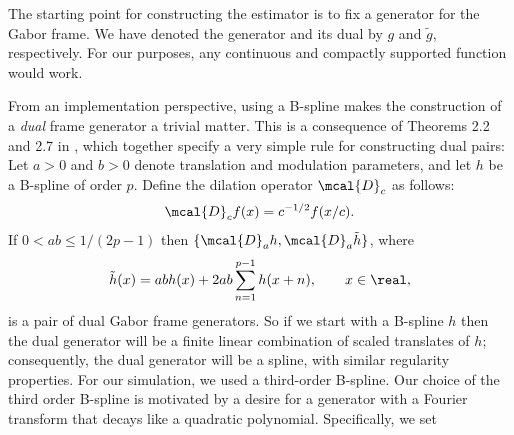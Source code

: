 The starting point for constructing the estimator is to fix a generator for the Gabor frame. We have denoted the generator and its dual by $g$ and $\tilde{g}$, respectively. For our purposes, any continuous and compactly supported function would work. \begin{comment} In fact, part of the appeal of the frame method is this flexibility. We may chose the frame generator to match our prior assumptions about the smoothness of the latent volatility function. In this regard, a suitably \emph{scaled}\footnote{More precisely \emph{dilated}. See \eqref{eq:dilation} for definition.} member of the family of B-splines is particularly suited to the task of a Gabor frame \emph{generator}. B-splines are  piecewise polynomials, so,  by varying their order or degree we may achieve any level of smoothness. Furthermore, the order of B-splines is directly related to the decay of their Fourier transforms. In fact the Fourier transform of a B-spline of order $p \ge 1$ decays like an $(p-1)$-th degree polynomial. This is important for the rate of decay of the MISE, and therefore, directly impacts the optimal choice of coefficients $H_n$ to estimate. The upshot is:  the higher the order of the B-spline, the smaller the number of  coefficients needed to achieve a given level of accuracy. \end{comment}       


From an implementation perspective, using a  B-spline  makes the construction of a \emph{dual}  frame generator a trivial matter. This is a consequence of Theorems 2.2 and 2.7 in \cite{Christensen2006}, which together specify a very simple rule for constructing  dual pairs: Let $a>0$ and $b>0$ denote  translation and modulation parameters, and let   $h$ be a B-spline of order $p$. Define the dilation operator  $\mcal{D}_c$ as follows:
\begin{align}
  \mcal{D}_c f(x) = c^{-1/2}f(x/c).  \label{eq:dilation}
\end{align}
If $0 < ab \le 1/(2 p -1)$ then  $\{\mcal{D}_a h, \mcal{D}_a\tilde{h}\}$, where 
\begin{align}
  \tilde{h}(x) = ab h(x) + 2 a b \sum^{p-1}_{n=1} h(x+n), \qquad  x \in \real, 
  \label{eq:gt}
\end{align}
is a pair of  dual Gabor  frame generators. So if we start with a B-spline $h$ then the dual generator will be a finite linear combination of scaled translates of $h$; consequently, the  dual generator will be a spline, with similar regularity properties.  For our simulation, we used a third-order B-spline. Our choice of the third order B-spline is motivated by a desire for a generator with a  Fourier transform that decays like a quadratic polynomial.   Specifically, we set
